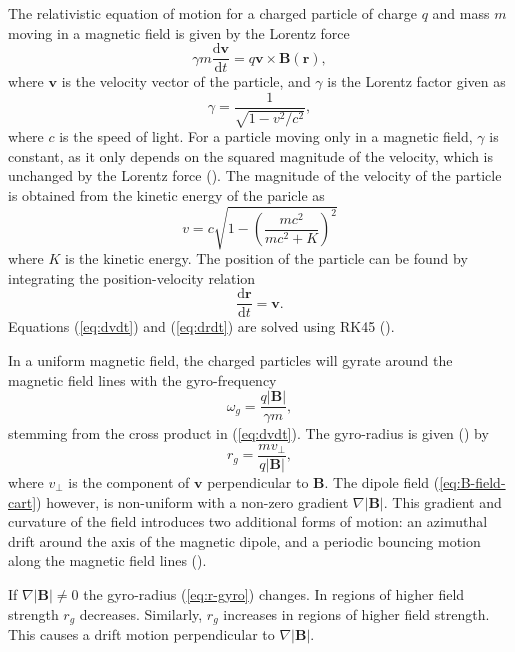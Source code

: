 The relativistic equation of motion for a charged particle of charge $q$ and mass $m$ moving in a magnetic field is given by the Lorentz force
\begin{equation}
    \gamma m \frac{\text{d}\bm{v}}{\text{d}t} = q\bm{v} \times \bm{B}(\bm{r}),
    \label{eq:dvdt}
\end{equation}
where $\bm{v}$ is the velocity vector of the particle, and $\gamma$ is the Lorentz factor given as
\begin{equation}
    \gamma = \frac{1}{\sqrt{1-v^2/c^2}},
\end{equation}
where $c$ is the speed of light. 
For a particle moving only in a magnetic field, $\gamma$ is constant, as it only depends on the squared magnitude of the velocity, which is unchanged by the Lorentz force (\cite{griffiths_2024}). 
The magnitude of the velocity of the particle is obtained from the kinetic energy of the paricle as
\begin{equation}
    v = c \sqrt{1-\left ( \frac{mc^2}{mc^2 + K}\right )^2}
    \label{eq:v}
\end{equation}
where $K$ is the kinetic energy. 
The position of the particle can be found by integrating the position-velocity relation
\begin{equation}
    \frac{\text{d}\bm{r}}{\text{d}t} = \bm{v}.
    \label{eq:drdt}
\end{equation}
Equations (\ref{eq:dvdt}) and (\ref{eq:drdt}) are solved using RK45 (\cite{DORMAND198019}). 

In a uniform magnetic field, the charged particles will gyrate around the magnetic field lines with the gyro-frequency
\begin{equation}
    \omega_g = \frac{q|\bm{B}|}{\gamma m},
    \label{eq:omega-gyr}
\end{equation}
stemming from the cross product in (\ref{eq:dvdt}). 
The gyro-radius is given (\cite{chen_2015}) by 
\begin{equation}
    r_g = \frac{mv_\perp}{q|\bm{B}|},
    \label{eq:r-gyro}
\end{equation}
where $v_\perp$ is the component of $\bm{v}$ perpendicular to $\bm{B}$.
The dipole field (\ref{eq:B-field-cart}) however, is non-uniform with a non-zero gradient $\nabla |\bm{B}|$. 
This gradient and curvature of the field introduces two additional forms of motion: an azimuthal drift around the axis of the magnetic dipole, and a periodic bouncing motion along the magnetic field lines (\cite{chen_2015}). 

If $\nabla |\bm{B}| \neq 0$ the gyro-radius (\ref{eq:r-gyro}) changes.
In regions of higher field strength $r_g$ decreases. 
Similarly, $r_g$ increases in regions of higher field strength. 
This causes a drift motion perpendicular to $\nabla |\bm{B}|$. 

